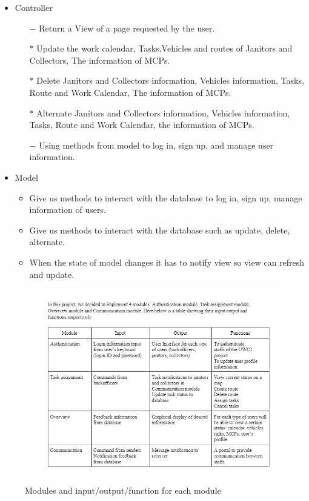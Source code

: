 \documentclass[a4paper]{article}
\begin{document}
\begin{itemize}
\begin{itemize}
    \end{itemize}
    \item Controller
    \begin{itemize}
\item[$-$] Return a View of a page requested by the user.
\item[$*$] Update the work calendar, Tasks,Vehicles and routes of Janitors and Collectors, The information of MCPs.
\item[$*$] Delete Janitors and Collectors information, Vehicles information, Tasks, Route and Work Calendar, The information of MCPs.
\item[$*$] Alternate Janitors and Collectors information, Vehicles information, Tasks, Route and Work Calendar, the information of MCPs.
\item[$-$] Using methods from model to log in, sign up, and manage user information.
    \end{itemize}

    \item Model
    \begin{itemize}
\item Give us methods to interact with the database to log in, sign up, manage information of users.
\item Give us methods to interact with the database such as update, delete, alternate.
\item When the state of model changes it has to notify view so view can refresh and update.

    \end{itemize}
\end{itemize}

\begin{figure}
\centering
  \includegraphics[width=0.8\linewidth]{module.png}
  \hypertarget{module}{\caption{Modules and input/output/function for each module}}
\end{figure}
\end{document}
